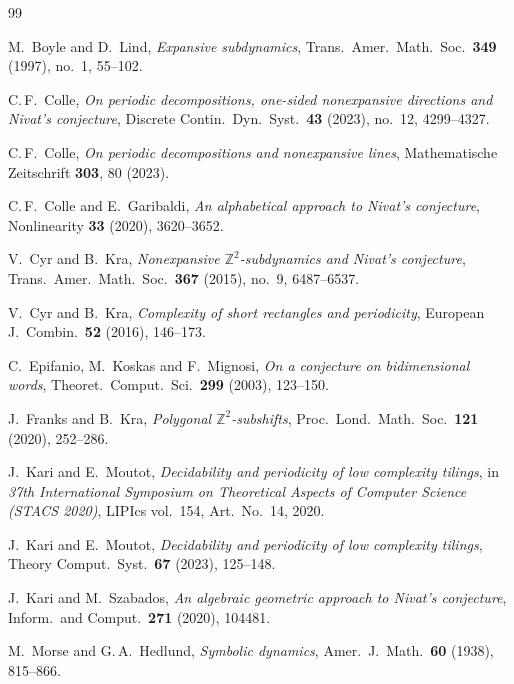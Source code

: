 \documentclass[12pt]{amsart}
\numberwithin{equation}{section}
\begin{document}
\begin{thebibliography}{99}
	
  M.~Boyle and D.~Lind,
  \textit{Expansive subdynamics},
  Trans.\ Amer.\ Math.\ Soc.\ \textbf{349} (1997), no.~1, 55--102.

  C.\,F.~Colle,
  \textit{On periodic decompositions, one-sided nonexpansive directions
  and Nivat's conjecture},
  Discrete Contin.\ Dyn.\ Syst.\ \textbf{43} (2023), no.~12,
  4299--4327.

  C.\,F.~Colle,
  \textit{On periodic decompositions and nonexpansive lines},
 Mathematische Zeitschrift   \textbf{303}, 80 (2023).

  C.\,F.~Colle and E.~Garibaldi,
  \textit{An alphabetical approach to Nivat's conjecture},
  Nonlinearity \textbf{33} (2020), 3620--3652.

  V.~Cyr and B.~Kra,
  \textit{Nonexpansive $\mathbb Z^2$-subdynamics and Nivat's conjecture},
  Trans.\ Amer.\ Math.\ Soc.\ \textbf{367} (2015), no.~9, 6487--6537.

  V.~Cyr and B.~Kra,
  \textit{Complexity of short rectangles and periodicity},
  European J.\ Combin.\ \textbf{52} (2016), 146--173.

  C.~Epifanio, M.~Koskas and F.~Mignosi,
  \textit{On a conjecture on bidimensional words},
  Theoret.\ Comput.\ Sci.\ \textbf{299} (2003), 123--150.

  J.~Franks and B.~Kra,
  \textit{Polygonal $\mathbb Z^2$-subshifts},
  Proc.\ Lond.\ Math.\ Soc.\ \textbf{121} (2020), 252--286.

  J.~Kari and E.~Moutot,
  \textit{Decidability and periodicity of low complexity tilings},
  in \textit{37th International Symposium on Theoretical Aspects of
  Computer Science (STACS 2020)}, LIPIcs vol.\ 154, Art.\ No.\ 14, 2020.

  J.~Kari and E.~Moutot,
  \textit{Decidability and periodicity of low complexity tilings},
  Theory Comput.\ Syst.\ \textbf{67} (2023), 125--148.

  J.~Kari and M.~Szabados,
  \textit{An algebraic geometric approach to Nivat's conjecture},
  Inform.\ and Comput.\ \textbf{271} (2020), 104481.

  M.~Morse and G.\,A.~Hedlund,
  \textit{Symbolic dynamics},
  Amer.\ J.\ Math.\ \textbf{60} (1938), 815--866.


\end{thebibliography}
\end{document}
